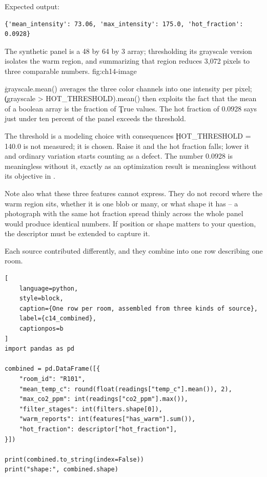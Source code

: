 Expected output:

\begin{lstlisting}[language=text, style=block, caption={3,072 pixels reduced to three numbers}, label={c14_descriptor_output}, captionpos=b]
{'mean_intensity': 73.06, 'max_intensity': 175.0, 'hot_fraction': 0.0928}
\end{lstlisting}

{The synthetic panel is a 48 by 64 by 3 array; thresholding its grayscale version isolates the warm region, and summarizing that region reduces 3,072 pixels to three comparable numbers.}
{fig:ch14-image}

\c{grayscale.mean()} averages the three color channels into one intensity per
pixel; \c{(grayscale > HOT_THRESHOLD).mean()} then exploits the fact that the
mean of a boolean array is the fraction of \c{True} values. The hot fraction of
0.0928 says just under ten percent of the panel exceeds the threshold.

\begin{ExplainBox}{The threshold is a modeling choice with consequences}
\c{HOT_THRESHOLD = 140.0} is not measured; it is chosen. Raise it and the hot
fraction falls; lower it and ordinary variation starts counting as a defect. The
number 0.0928 is meaningless without it, exactly as an optimization result is
meaningless without its objective in .

Note also what these three features cannot express. They do not record where the
warm region sits, whether it is one blob or many, or what shape it has -- a
photograph with the same hot fraction spread thinly across the whole panel would
produce identical numbers. If position or shape matters to your question, the
descriptor must be extended to capture it.
\end{ExplainBox}


Each source contributed differently, and they combine into one row describing
one room.

\begin{lstlisting}[
    language=python,
    style=block,
    caption={One row per room, assembled from three kinds of source},
    label={c14_combined},
    captionpos=b
]
import pandas as pd

combined = pd.DataFrame([{
    "room_id": "R101",
    "mean_temp_c": round(float(readings["temp_c"].mean()), 2),
    "max_co2_ppm": int(readings["co2_ppm"].max()),
    "filter_stages": int(filters.shape[0]),
    "warm_reports": int(features["has_warm"].sum()),
    "hot_fraction": descriptor["hot_fraction"],
}])

print(combined.to_string(index=False))
print("shape:", combined.shape)
\end{lstlisting}

